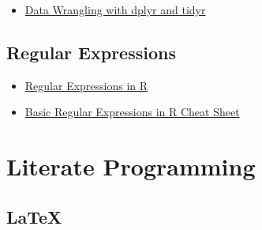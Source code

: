 \documentclass[]{book}
\providecommand{\tightlist}{%
  \setlength{\itemsep}{0pt}\setlength{\parskip}{0pt}}
\begin{document}
\begin{itemize}
\tightlist
\item
  \href{https://www.rstudio.com/wp-content/uploads/2015/02/data-wrangling-cheatsheet.pdf}{Data Wrangling with dplyr and tidyr}
\end{itemize}

\hypertarget{regular-expressions}{%
\section{Regular Expressions}\label{regular-expressions}}

\begin{itemize}
\item
  \href{https://stringr.tidyverse.org/articles/regular-expressions.html}{Regular Expressions in R}
\item
  \href{https://www.rstudio.com/wp-content/uploads/2016/09/RegExCheatsheet.pdf}{Basic Regular Expressions in R Cheat Sheet}
\end{itemize}

\hypertarget{literate-programming}{%
\chapter*{Literate Programming}\label{literate-programming}}

\hypertarget{latex}{%
\section{LaTeX}\label{latex}}
\end{document}
